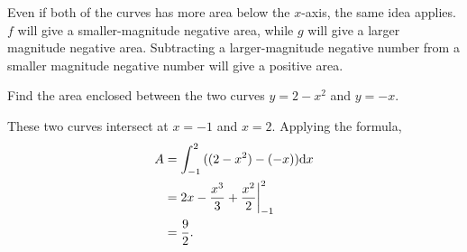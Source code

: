 Even if both of the curves has more area below the $x$-axis, the same idea applies.
$f$ will give a smaller-magnitude negative area, while $g$ will give a larger magnitude negative area.
Subtracting a larger-magnitude negative number from a smaller magnitude negative number will give a positive area.

\begin{example}
	Find the area enclosed between the two curves $y=2-x^2$ and $y=-x$.
\end{example}
\begin{answer}
	These two curves intersect at $x=-1$ and $x=2$.
	Applying the formula,
	\begin{align*}
		A &= \int_{-1}^{2}{((2-x^2)-(-x))\mathrm{d} x} \\
		&= 2x-\frac{x^3}{3} + \frac{x^2}{2}\biggr\rvert_{-1}^{2} \\
		&= \frac{9}{2}.
	\end{align*}
\end{answer}

